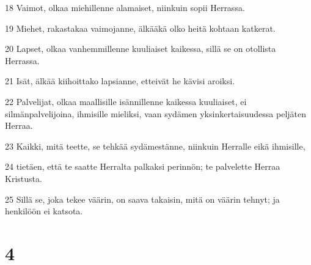 \par 18 Vaimot, olkaa miehillenne alamaiset, niinkuin sopii Herrassa.
\par 19 Miehet, rakastakaa vaimojanne, älkääkä olko heitä kohtaan katkerat.
\par 20 Lapset, olkaa vanhemmillenne kuuliaiset kaikessa, sillä se on otollista Herrassa.
\par 21 Isät, älkää kiihoittako lapsianne, etteivät he kävisi aroiksi.
\par 22 Palvelijat, olkaa maallisille isännillenne kaikessa kuuliaiset, ei silmänpalvelijoina, ihmisille mieliksi, vaan sydämen yksinkertaisuudessa peljäten Herraa.
\par 23 Kaikki, mitä teette, se tehkää sydämestänne, niinkuin Herralle eikä ihmisille,
\par 24 tietäen, että te saatte Herralta palkaksi perinnön; te palvelette Herraa Kristusta.
\par 25 Sillä se, joka tekee väärin, on saava takaisin, mitä on väärin tehnyt; ja henkilöön ei katsota.

\chapter{4}

